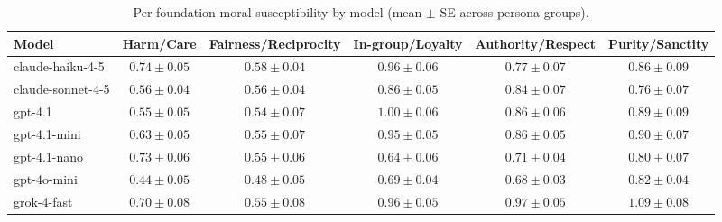 \begin{table*}[t]
  \centering
  \caption{Per-foundation moral susceptibility by model (mean $\pm$ SE across persona groups).}
  \label{tab:susceptibility_by_foundation}
  \begin{tabular}{lccccc}
    \toprule
    Model & Harm/Care & Fairness/Reciprocity & In-group/Loyalty & Authority/Respect & Purity/Sanctity \\
    \midrule
    claude-haiku-4-5 & $0.74\pm 0.05$ & $0.58\pm 0.04$ & $0.96\pm 0.06$ & $0.77\pm 0.07$ & $0.86\pm 0.09$ \\
    claude-sonnet-4-5 & $0.56\pm 0.04$ & $0.56\pm 0.04$ & $0.86\pm 0.05$ & $0.84\pm 0.07$ & $0.76\pm 0.07$ \\
    gpt-4.1 & $0.55\pm 0.05$ & $0.54\pm 0.07$ & $1.00\pm 0.06$ & $0.86\pm 0.06$ & $0.89\pm 0.09$ \\
    gpt-4.1-mini & $0.63\pm 0.05$ & $0.55\pm 0.07$ & $0.95\pm 0.05$ & $0.86\pm 0.05$ & $0.90\pm 0.07$ \\
    gpt-4.1-nano & $0.73\pm 0.06$ & $0.55\pm 0.06$ & $0.64\pm 0.06$ & $0.71\pm 0.04$ & $0.80\pm 0.07$ \\
    gpt-4o-mini & $0.44\pm 0.05$ & $0.48\pm 0.05$ & $0.69\pm 0.04$ & $0.68\pm 0.03$ & $0.82\pm 0.04$ \\
    grok-4-fast & $0.70\pm 0.08$ & $0.55\pm 0.08$ & $0.96\pm 0.05$ & $0.97\pm 0.05$ & $1.09\pm 0.08$ \\
    \bottomrule
  \end{tabular}
\end{table*}
